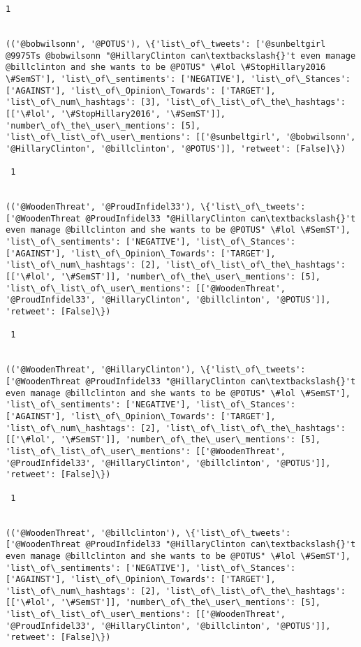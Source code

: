 \documentclass[11pt]{article}
\begin{document}
\begin{Verbatim}[commandchars=\\\{\}]
 1
 

(('@bobwilsonn', '@POTUS'), \{'list\_of\_tweets': ['@sunbeltgirl @9975Ts @bobwilsonn "@HillaryClinton can\textbackslash{}'t even manage @billclinton and she wants to be @POTUS" \#lol \#StopHillary2016 \#SemST'], 'list\_of\_sentiments': ['NEGATIVE'], 'list\_of\_Stances': ['AGAINST'], 'list\_of\_Opinion\_Towards': ['TARGET'], 'list\_of\_num\_hashtags': [3], 'list\_of\_list\_of\_the\_hashtags': [['\#lol', '\#StopHillary2016', '\#SemST']], 'number\_of\_the\_user\_mentions': [5], 'list\_of\_list\_of\_user\_mentions': [['@sunbeltgirl', '@bobwilsonn', '@HillaryClinton', '@billclinton', '@POTUS']], 'retweet': [False]\})

 1
 

(('@WoodenThreat', '@ProudInfidel33'), \{'list\_of\_tweets': ['@WoodenThreat @ProudInfidel33 "@HillaryClinton can\textbackslash{}'t even manage @billclinton and she wants to be @POTUS" \#lol \#SemST'], 'list\_of\_sentiments': ['NEGATIVE'], 'list\_of\_Stances': ['AGAINST'], 'list\_of\_Opinion\_Towards': ['TARGET'], 'list\_of\_num\_hashtags': [2], 'list\_of\_list\_of\_the\_hashtags': [['\#lol', '\#SemST']], 'number\_of\_the\_user\_mentions': [5], 'list\_of\_list\_of\_user\_mentions': [['@WoodenThreat', '@ProudInfidel33', '@HillaryClinton', '@billclinton', '@POTUS']], 'retweet': [False]\})

 1
 

(('@WoodenThreat', '@HillaryClinton'), \{'list\_of\_tweets': ['@WoodenThreat @ProudInfidel33 "@HillaryClinton can\textbackslash{}'t even manage @billclinton and she wants to be @POTUS" \#lol \#SemST'], 'list\_of\_sentiments': ['NEGATIVE'], 'list\_of\_Stances': ['AGAINST'], 'list\_of\_Opinion\_Towards': ['TARGET'], 'list\_of\_num\_hashtags': [2], 'list\_of\_list\_of\_the\_hashtags': [['\#lol', '\#SemST']], 'number\_of\_the\_user\_mentions': [5], 'list\_of\_list\_of\_user\_mentions': [['@WoodenThreat', '@ProudInfidel33', '@HillaryClinton', '@billclinton', '@POTUS']], 'retweet': [False]\})

 1
 

(('@WoodenThreat', '@billclinton'), \{'list\_of\_tweets': ['@WoodenThreat @ProudInfidel33 "@HillaryClinton can\textbackslash{}'t even manage @billclinton and she wants to be @POTUS" \#lol \#SemST'], 'list\_of\_sentiments': ['NEGATIVE'], 'list\_of\_Stances': ['AGAINST'], 'list\_of\_Opinion\_Towards': ['TARGET'], 'list\_of\_num\_hashtags': [2], 'list\_of\_list\_of\_the\_hashtags': [['\#lol', '\#SemST']], 'number\_of\_the\_user\_mentions': [5], 'list\_of\_list\_of\_user\_mentions': [['@WoodenThreat', '@ProudInfidel33', '@HillaryClinton', '@billclinton', '@POTUS']], 'retweet': [False]\})


\end{Verbatim}
\end{document}
